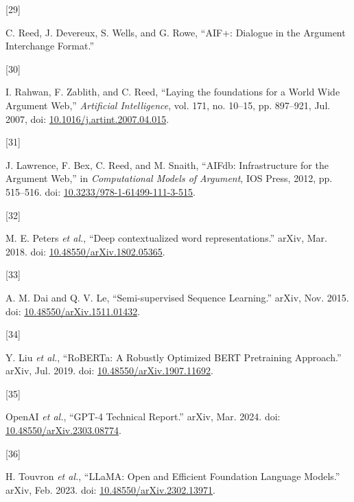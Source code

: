 \documentclass[twocolumn,twoside]{article}
\newlength{\cslhangindent}
\newlength{\csllabelwidth}
\newenvironment{CSLReferences}[2] %
 {\begin{list}{}{%
  \setlength{\itemindent}{0pt}
  \setlength{\leftmargin}{0pt}
  \setlength{\parsep}{0pt}
  \ifodd #1
   \setlength{\leftmargin}{\cslhangindent}
   \setlength{\itemindent}{-1\cslhangindent}
  \fi
  \setlength{\itemsep}{#2\baselineskip}}}
 {\end{list}}
\newcommand{\CSLLeftMargin}[1]{\parbox[t]{\csllabelwidth}{\strut#1\strut}}
\newcommand{\CSLRightInline}[1]{\parbox[t]{\linewidth - \csllabelwidth}{\strut#1\strut}}
\begin{document}
\begin{CSLReferences}{0}{0}
\CSLLeftMargin{{[}29{]} }%
\CSLRightInline{C. Reed, J. Devereux, S. Wells, and G. Rowe, {``{AIF}+:
{Dialogue} in the {Argument Interchange Format}.''}}

\CSLLeftMargin{{[}30{]} }%
\CSLRightInline{I. Rahwan, F. Zablith, and C. Reed, {``Laying the
foundations for a {World Wide Argument Web},''} \emph{Artificial
Intelligence}, vol. 171, no. 10--15, pp. 897--921, Jul. 2007, doi:
\href{https://doi.org/10.1016/j.artint.2007.04.015}{10.1016/j.artint.2007.04.015}.}

\CSLLeftMargin{{[}31{]} }%
\CSLRightInline{J. Lawrence, F. Bex, C. Reed, and M. Snaith, {``{AIFdb}:
{Infrastructure} for the {Argument Web},''} in \emph{Computational
{Models} of {Argument}}, IOS Press, 2012, pp. 515--516. doi:
\href{https://doi.org/10.3233/978-1-61499-111-3-515}{10.3233/978-1-61499-111-3-515}.}

\CSLLeftMargin{{[}32{]} }%
\CSLRightInline{M. E. Peters \emph{et al.}, {``Deep contextualized word
representations.''} arXiv, Mar. 2018. doi:
\href{https://doi.org/10.48550/arXiv.1802.05365}{10.48550/arXiv.1802.05365}.}

\CSLLeftMargin{{[}33{]} }%
\CSLRightInline{A. M. Dai and Q. V. Le, {``Semi-supervised {Sequence
Learning}.''} arXiv, Nov. 2015. doi:
\href{https://doi.org/10.48550/arXiv.1511.01432}{10.48550/arXiv.1511.01432}.}

\CSLLeftMargin{{[}34{]} }%
\CSLRightInline{Y. Liu \emph{et al.}, {``{RoBERTa}: {A Robustly
Optimized BERT Pretraining Approach}.''} arXiv, Jul. 2019. doi:
\href{https://doi.org/10.48550/arXiv.1907.11692}{10.48550/arXiv.1907.11692}.}

\CSLLeftMargin{{[}35{]} }%
\CSLRightInline{OpenAI \emph{et al.}, {``{GPT-4 Technical Report}.''}
arXiv, Mar. 2024. doi:
\href{https://doi.org/10.48550/arXiv.2303.08774}{10.48550/arXiv.2303.08774}.}

\CSLLeftMargin{{[}36{]} }%
\CSLRightInline{H. Touvron \emph{et al.}, {``{LLaMA}: {Open} and
{Efficient Foundation Language Models}.''} arXiv, Feb. 2023. doi:
\href{https://doi.org/10.48550/arXiv.2302.13971}{10.48550/arXiv.2302.13971}.}


\end{CSLReferences}
\end{document}
